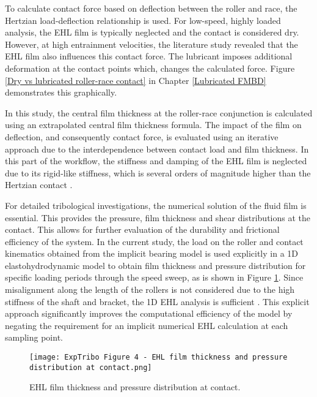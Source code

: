 To calculate contact force based on deflection between the roller and race, the Hertzian load-deflection relationship is used. For low-speed, highly loaded analysis, the EHL film is typically neglected and the contact is considered dry. However, at high entrainment velocities, the literature study revealed that the EHL film also influences this contact force. The lubricant imposes additional deformation at the contact points which, changes the calculated force. Figure \ref{Dry vs lubricated roller-race contact} in Chapter \ref{Lubricated FMBD} demonstrates this graphically. 

In this study, the central film thickness at the roller-race conjunction is calculated using an extrapolated central film thickness formula. The impact of the film on deflection, and consequently contact force, is evaluated using an iterative approach due to the interdependence between contact load and film thickness. In this part of the workflow, the stiffness and damping of the EHL film is neglected due to its rigid-like stiffness, which is several orders of magnitude higher than the Hertzian contact \cite{Walford1983} \cite{Dareing1975} \cite{Mehdigoli1990}.

For detailed tribological investigations, the numerical solution of the fluid film is essential. This provides the pressure, film thickness and shear distributions at the contact. This allows for further evaluation of the durability and frictional efficiency of the system. In the current study, the load on the roller and contact kinematics obtained from the implicit bearing model is used explicitly in a 1D elastohydrodynamic model to obtain film thickness and pressure distribution for specific loading periods through the speed sweep, as is shown in Figure \ref{EHL film thickness and pressure distribution at contact}. Since misalignment along the length of the rollers is not considered due to the high stiffness of the shaft and bracket, the 1D EHL analysis is sufficient \cite{Gupta1979}. This explicit approach significantly improves the computational efficiency of the model by negating the requirement for an implicit numerical EHL calculation at each sampling point.

\begin{figure}
	\centering
	\texttt{[image: ExpTribo Figure 4 - EHL film thickness and pressure distribution at contact.png]}
	\caption{EHL film thickness and pressure distribution at contact.}
	\label{EHL film thickness and pressure distribution at contact}
\end{figure}

